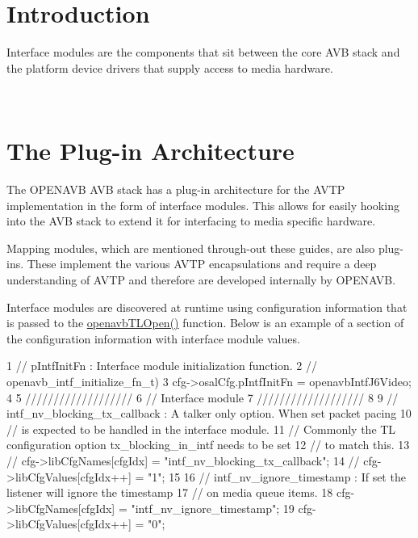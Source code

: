 \hypertarget{sdk_avtp_interface_module_dev_sdk_avtp_intf_module_introduction}{}\section{Introduction }\label{sdk_avtp_interface_module_dev_sdk_avtp_intf_module_introduction}
Interface modules are the components that sit between the core A\+VB stack and the platform device drivers that supply access to media hardware.

~\newline
\hypertarget{sdk_avtp_interface_module_dev_sdk_avtp_intf_module_plugin}{}\section{The Plug-\/in Architecture }\label{sdk_avtp_interface_module_dev_sdk_avtp_intf_module_plugin}
The O\+P\+E\+N\+A\+VB A\+VB stack has a plug-\/in architecture for the A\+V\+TP implementation in the form of interface modules. This allows for easily hooking into the A\+VB stack to extend it for interfacing to media specific hardware.

Mapping modules, which are mentioned through-\/out these guides, are also plug-\/ins. These implement the various A\+V\+TP encapsulations and require a deep understanding of A\+V\+TP and therefore are developed internally by O\+P\+E\+N\+A\+VB.

Interface modules are discovered at runtime using configuration information that is passed to the \hyperlink{build_2sdk__eavb_2openavb__tl__pub_8h_a4952af6d10075781ffb320af2ff1665b}{openavb\+T\+L\+Open()} function. Below is an example of a section of the configuration information with interface module values.


\begin{DoxyCode}
1 // pIntfInitFn : Interface module initialization function.
2 // openavb\_intf\_initialize\_fn\_t)
3 cfg->osalCfg.pIntfInitFn = openavbIntfJ6Video;
4 
5 ///////////////////
6 // Interface module
7 ///////////////////
8 
9 // intf\_nv\_blocking\_tx\_callback : A talker only option. When set packet pacing
10 // is expected to be handled in the interface module.
11 // Commonly the TL configuration option tx\_blocking\_in\_intf needs to be set
12 // to match this.
13 // cfg->libCfgNames[cfgIdx] = "intf\_nv\_blocking\_tx\_callback";
14 // cfg->libCfgValues[cfgIdx++] = "1";
15 
16 // intf\_nv\_ignore\_timestamp : If set the listener will ignore the timestamp
17 // on media queue items.
18 cfg->libCfgNames[cfgIdx] = "intf\_nv\_ignore\_timestamp";
19 cfg->libCfgValues[cfgIdx++] = "0";
\end{DoxyCode}


